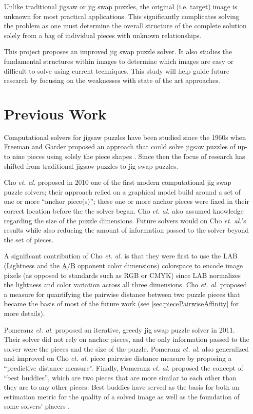 \documentclass{report}
\begin{document}
Unlike traditional jigsaw or jig swap puzzles, the original (i.e. target) image is unknown for most practical applications.  This significantly complicates solving the problem as one must determine the overall structure of the complete solution solely from a bag of individual pieces with unknown relationships.

This project proposes an improved jig swap puzzle solver.  It also studies the fundamental structures within images to determine which images are easy or difficult to solve using current techniques.  This study will help guide future research by focusing on the weaknesses with state of the art approaches. 

\pagebreak
\section{Previous Work}\label{sec:previousWork}

Computational solvers for jigsaw puzzles have been studied since the 1960s when Freeman and Garder proposed an approach that could solve jigsaw puzzles of up-to nine pieces using solely the piece shapes \cite{freeman1964}.  Since then the focus of research has shifted from traditional jigsaw puzzles to jig swap puzzles.  

Cho \textit{et. al.} \citep{cho2010} proposed in 2010 one of the first modern computational jig swap puzzle solvers; their approach relied on a graphical model build around a set of one or more ``anchor piece(s)''; these one or more anchor pieces were fixed in their correct location before the the solver began.  Cho \textit{et. al.} also assumed knowledge regarding the size of the puzzle dimensions.  Future solvers would on Cho \textit{et. al.}'s results while also reducing the amount of information passed to the solver beyond the set of pieces.

A significant contribution of Cho \textit{et. al.} is that they were first to use the LAB  (\underline{L}ightness and the \underline{A}/\underline{B} opponent color dimensions) colorspace to encode image pixels (as opposed to standards such as RGB or CMYK) since LAB normalizes the lightness and color variation across all three dimensions.  Cho \textit{et. al.} proposed a measure for quantifying the pairwise distance between two puzzle pieces that became the basis of most of the future work (see \ref{sec:piecePairwiseAffinity} for more details).  

Pomeranz \textit{et. al.} \cite{pomeranz2011} proposed an iterative, greedy jig swap puzzle solver in 2011.  Their solver did not rely on anchor pieces, and the only information passed to the solver were the pieces and the size of the puzzle.  Pomeranz \textit{et. al.} also generalized and improved on Cho \textit{et. al.} piece pairwise distance measure by proposing a ``predictive distance measure''.  Finally, Pomeranz \textit{et. al.} proposed the concept of ``best buddies'', which are two pieces that are more similar to each other than they are to any other pieces.  Best buddies have served as the basis for both an estimation metric for the quality of a solved image as well as the foundation of some solvers' placers \cite{paikin2015}.
\end{document}
